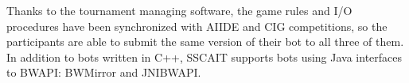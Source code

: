 \documentclass{llncs}
\begin{document}
Thanks to the tournament managing software, the game rules and I/O procedures have been synchronized with AIIDE and CIG competitions, so the participants are able to submit the same version of their bot to all three of them. In addition to bots written in C++, SSCAIT supports bots using Java interfaces to BWAPI: BWMirror and JNIBWAPI. 




\end{document}
